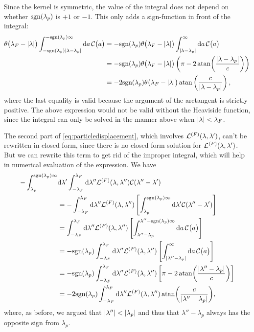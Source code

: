 \documentclass[11pt, a4paper]{report} %
\begin{document}
Since the kernel is symmetric,  the value of the integral does not depend on whether \(\mathrm{sgn}\qty(\lambda_p)\) is \(+1\) or \(-1\).
This only adds a sign-function in front of the integral:
\begin{align}
	\theta\qty\big(\lambda_F - \abs{\lambda}) \int_{-\textrm{sgn}\qty(\lambda_p)\abs{\lambda-\lambda_p}}^{ - \textrm{sgn}\qty(\lambda_p)\infty} \dd a\,\mathcal{C}\qty\big(a) &= - \textrm{sgn}\qty(\lambda_p) \theta\qty\big(\lambda_F - \abs{\lambda}) \int_{\abs{\lambda-\lambda_p}}^{\infty} \dd a\,\mathcal{C}\qty\big(a)\\
	&= - \textrm{sgn}\qty(\lambda_p) \theta\qty\big(\lambda_F - \abs{\lambda})  \left( \pi - 2\atan(\frac{\abs{\lambda - \lambda_p}}{c})\right)\label{eq:dpdeltanonsimplified}\\
	&= - 2 \textrm{sgn}\qty(\lambda_p) \theta\qty\big(\lambda_F - \abs{\lambda})  \atan\left(\frac{c}{\abs{\lambda-\lambda_p}}\right),
\end{align}
where the last equality is valid because the argument of the arctangent is strictly positive.
The above expression would not be valid without the Heaviside function, since the integral can only be solved in the manner above when \(\abs{\lambda}< \lambda_F\).

The second part of \cref{eq:particledisplacement}, which involves \(\mathcal{L}^{(F)}\qty(\lambda,\lambda')\), can't be rewritten in closed form, since there is no closed form solution for \(\mathcal{L}^{(F)}\qty(\lambda,\lambda')\).
But we can rewrite this term to get rid of the improper integral, which will help in numerical evaluation of the expression.
We have
\begin{align}
	- \int_{\lambda_p}^{\textrm{sgn}\qty(\lambda_p)\infty} &\dd \lambda' \int_{-\lambda_F}^{\lambda_F} \dd \lambda''  \mathcal{L}^{(F)}\qty(\lambda,\lambda'') \mathcal{C}\qty(\lambda''-\lambda')\\
	&= -  \int_{-\lambda_F}^{\lambda_F} \dd \lambda''   \mathcal{L}^{(F)}\qty(\lambda,\lambda'') \left[\int_{\lambda_p}^{\textrm{sgn}\qty(\lambda_p)\infty} \dd \lambda'\mathcal{C}\qty(\lambda''-\lambda') \right]\\
	&=   \int_{-\lambda_F}^{\lambda_F} \dd \lambda''   \mathcal{L}^{(F)}\qty(\lambda,\lambda'') \left[\int_{\lambda''-\lambda_p}^{\lambda''-\textrm{sgn}\qty(\lambda_p)\infty} \dd a\,\mathcal{C}\qty\big(a) \right]\\
	&= -\textrm{sgn}\qty(\lambda_p) \int_{-\lambda_F}^{\lambda_F} \dd \lambda''   \mathcal{L}^{(F)}\qty(\lambda,\lambda'') \left[\int_{\abs{\lambda''-\lambda_p}}^{\infty} \dd a\,\mathcal{C}\qty\big(a) \right]\\
	&= -\textrm{sgn}\qty(\lambda_p) \int_{-\lambda_F}^{\lambda_F} \dd \lambda''   \mathcal{L}^{(F)}\qty(\lambda,\lambda'') \left[\pi - 2\atan(\frac{\abs{\lambda''-\lambda_p}}{c})\right]\\
	&= -2\textrm{sgn}\qty(\lambda_p) \int_{-\lambda_F}^{\lambda_F} \dd \lambda''   \mathcal{L}^{(F)}\qty(\lambda,\lambda'') \atan(\frac{c}{\abs{\lambda''-\lambda_p}}),
\end{align}
where, as before, we argued that \(\abs{\lambda''} < \abs{\lambda_p}\) and thus that \(\lambda'' - \lambda_p\) always has the opposite sign from \(\lambda_p\).
\end{document}
